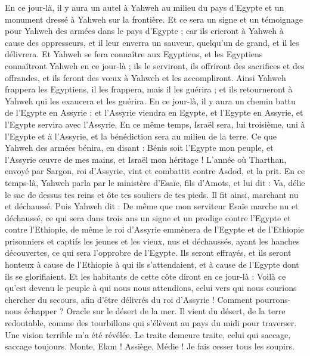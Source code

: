 \begin{multicols}{2}
En ce jour-là, il y aura un autel à Yahweh au milieu du pays d'Egypte et un monument dressé à Yahweh sur la frontière.
Et ce sera un signe et un témoignage pour Yahweh des armées dans le pays d'Egypte ; car ils crieront à Yahweh à cause des oppresseurs, et il leur enverra un sauveur, quelqu'un de grand, et il les délivrera.
Et Yahweh se fera connaître aux Egyptiens, et les Egyptiens connaîtront Yahweh en ce jour-là ; ils le serviront, ils offriront des sacrifices et des offrandes, et ils feront des vœux à Yahweh et les accompliront.
Ainsi Yahweh frappera les Egyptiens, il les frappera, mais il les guérira ; et ils retourneront à Yahweh qui les exaucera et les guérira.
En ce jour-là, il y aura un chemin battu de l'Egypte en Assyrie ; et l'Assyrie viendra en Egypte, et l'Egypte en Assyrie, et l'Egypte servira avec l'Assyrie.
En ce même temps, Israël sera, lui troisième, uni à l'Egypte et à l'Assyrie, et la bénédiction sera au milieu de la terre.
Ce que Yahweh des armées bénira, en disant : Bénis soit l'Egypte mon peuple, et l'Assyrie œuvre de mes mains, et Israël mon héritage !
\VerseOne{}L'année où Tharthan, envoyé par Sargon, roi d'Assyrie, vint et combattit contre Asdod, et la prit.
En ce temps-là, Yahweh parla par le ministère d'Esaïe, fils d'Amots, et lui dit : Va, délie le sac de dessus tes reins et ôte tes souliers de tes pieds. Il fit ainsi, marchant nu et déchaussé.
Puis Yahweh dit : De même que mon serviteur Esaïe marche nu et déchaussé, ce qui sera dans trois ans un signe et un prodige contre l'Egypte et contre l'Ethiopie,
de même le roi d'Assyrie emmènera de l'Egypte et de l'Ethiopie prisonniers et captifs les jeunes et les vieux, nus et déchaussés, ayant les hanches découvertes, ce qui sera l'opprobre de l'Egypte.
Ils seront effrayés, et ils seront honteux à cause de l'Ethiopie à qui ils s'attendaient, et à cause de l'Egypte dont ils se glorifiaient.
Et les habitants de cette côte diront en ce jour-là : Voilà ce qu'est devenu le peuple à qui nous nous attendions, celui vers qui nous courions chercher du secours, afin d'être délivrés du roi d'Assyrie ! Comment pourrons-nous échapper ?
\VerseOne{}Oracle sur le désert de la mer. Il vient du désert, de la terre redoutable, comme des tourbillons qui s'élèvent au pays du midi pour traverser.
Une vision terrible m'a été révélée. Le traite demeure traite, celui qui saccage, saccage toujours. Monte, Elam ! Assiège, Médie ! Je fais cesser tous les soupirs.

\end{multicols}
